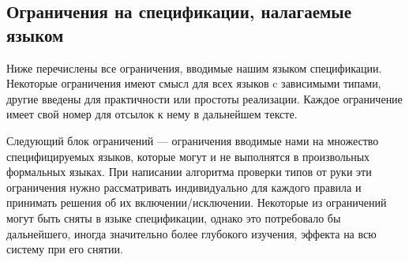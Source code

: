\subsection{Ограничения на спецификации, налагаемые языком}\label{constraints}

Ниже перечислены все ограничения, вводимые нашим языком спецификации. Некоторые ограничения имеют смысл для всех языков c зависимыми типами, другие введены для практичности или простоты реализации. Каждое ограничение имеет свой номер для отсылок к нему в дальнейшем тексте.

\hfill

Следующий блок ограничений --- ограничения вводимые нами на множество специфицируемых языков, которые могут и не выполнятся в произвольных формальных языках. При написании алгоритма проверки типов от руки эти ограничения нужно рассматривать индивидуально для каждого правила и принимать решения об их включении/исключении. Некоторые из ограничений могут быть сняты в языке спецификации, однако это потребовало бы дальнейшего, иногда значительно более глубокого изучения, эффекта на всю систему при его снятии.
